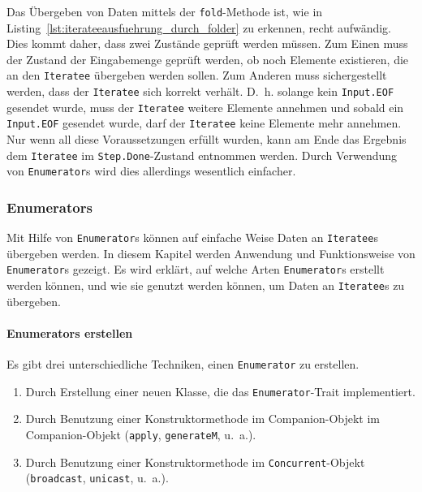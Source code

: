 \documentclass[draft=false
              ,paper=a4
              ,twoside=false
              ,fontsize=11pt
              ,headsepline
              ,BCOR10mm
              ,DIV11
              ]{scrbook}
\begin{document}
Das Übergeben von Daten mittels der \lstinline|fold|-Methode ist, wie in Listing~\ref{lst:iterateeausfuehrung_durch_folder} zu erkennen, recht aufwändig.
Dies kommt daher, dass zwei Zustände geprüft werden müssen.
Zum Einen muss der Zustand der Eingabemenge geprüft werden, ob noch Elemente existieren, die an den \lstinline|Iteratee| übergeben werden sollen.
Zum Anderen muss sichergestellt werden, dass der \lstinline|Iteratee| sich korrekt verhält.
D.~h. solange kein \lstinline|Input.EOF| gesendet wurde, muss der \lstinline|Iteratee| weitere Elemente annehmen und sobald ein \lstinline|Input.EOF| gesendet wurde, darf der \lstinline|Iteratee| keine Elemente mehr annehmen.
Nur wenn all diese Voraussetzungen erfüllt wurden, kann am Ende das Ergebnis dem \lstinline|Iteratee| im \lstinline|Step.Done|-Zustand entnommen werden.
Durch Verwendung von \lstinline|Enumerator|s wird dies allerdings wesentlich einfacher.



\subsubsection{Enumerators} %
\label{ssub:enumerators}

Mit Hilfe von \lstinline|Enumerator|s können auf einfache Weise Daten an \lstinline|Iteratee|s übergeben werden.
In diesem Kapitel werden Anwendung und Funktionsweise von \lstinline|Enumerator|s gezeigt.
Es wird erklärt, auf welche Arten \lstinline|Enumerator|s erstellt werden können, und wie sie genutzt werden können, um Daten an \lstinline|Iteratee|s zu übergeben.

\paragraph{Enumerators erstellen} %
\label{par:enumerators_erstellen}\mbox{} %

Es gibt drei unterschiedliche Techniken, einen \lstinline|Enumerator| zu erstellen.
\begin{enumerate}
  \item Durch Erstellung einer neuen Klasse, die das \lstinline|Enumerator|-Trait implementiert.
  \item Durch Benutzung einer Konstruktormethode im Companion-Objekt im Companion-Objekt (\lstinline|apply|, \lstinline|generateM|, u.~a.).
  \item Durch Benutzung einer Konstruktormethode im \lstinline|Concurrent|-Objekt (\lstinline|broadcast|, \lstinline|unicast|, u.~a.).
\end{enumerate}
\end{document}
